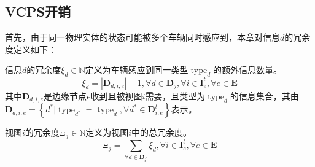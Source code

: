 \subsection[\hspace{-2pt}VCPS开销]{{ \hspace{-8pt}VCPS开销}}

首先，由于同一物理实体的状态可能被多个车辆同时感应到，本章对信息$d$的冗余度定义如下：
\begin{definition}
信息$d$的冗余度$\xi_d \in \mathbb{N}$定义为车辆感应到同一类型$\operatorname{type}_d$的额外信息数量。
\begin{equation}
    \xi_d= \left | \mathbf{D}_{d, i, e} \right| - 1, \forall d \in \mathbf{D}_j, \forall i \in \mathbf{I}_{e}^{t}, \forall e \in \mathbf{E}
\end{equation}
\noindent 其中$\mathbf{D}_{d, i, e}$是边缘节点$e$收到且被视图$i$需要，且类型为$\operatorname{type}_d$的信息集合，其由$\mathbf{D}_{d, i, e}=\left\{ d^* \vert \operatorname{type}_{d^*} = \operatorname{type}_{d}, \forall d^* \in \mathbf{D}_{i, e}^t \right \}$表示。

\end{definition}
\begin{definition}
视图$i$的冗余度$\Xi_j \in \mathbb{N}$定义为视图$i$中的总冗余度。
	\begin{equation}
       \Xi_j =  \sum_{\forall d \in \mathbf{D}_{i^{\prime}}} \xi_d, \forall i \in \mathbf{I}_{e}^{t}, \forall e \in \mathbf{E}
       \label{equ 4-20}
    \end{equation}
\end{definition}

